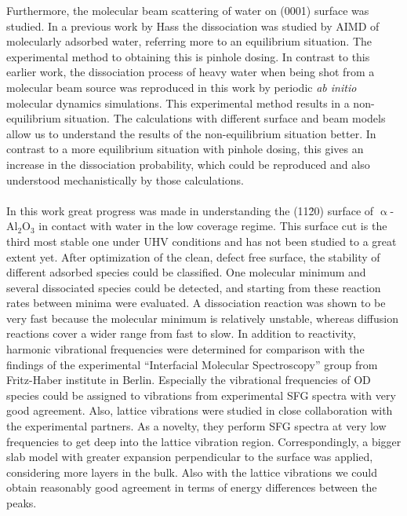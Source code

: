 \documentclass[11pt,DIV=13,BCOR=5mm,a4paper,headinclude]{scrbook}
\begin{document}
Furthermore, the molecular beam scattering of water on (0001) surface was studied.
In a previous work by Hass the dissociation was studied by AIMD of molecularly adsorbed water, referring more to an equilibrium situation.
The experimental method to obtaining this is pinhole dosing.
In contrast to this earlier work, the dissociation process of heavy water when being shot from a molecular beam source was reproduced in this work by periodic \textit{ab initio} molecular dynamics simulations.
This experimental method results in a non-equilibrium situation.
The calculations with different surface and beam models allow us to understand the results of the non-equilibrium situation better.
In contrast to a more equilibrium situation with pinhole dosing, this gives an increase in the dissociation probability, which could be reproduced and also understood mechanistically by those calculations.
\\\\
In this work great progress was made in understanding the (11\=20) surface of $\upalpha$-Al$_2$O$_3$ in contact with water in the low coverage regime.
This surface cut is the third most stable one under UHV conditions and has not been studied to a great extent yet.
After optimization of the clean, defect free surface, the stability of different adsorbed species could be classified.
One molecular minimum and several dissociated species could be detected, and starting from these reaction rates between minima were evaluated.
A dissociation reaction was shown to be very fast because the molecular minimum is relatively unstable, whereas diffusion reactions cover a wider range from fast to slow.
In addition to reactivity, harmonic vibrational frequencies were determined for comparison with the findings of the experimental ``Interfacial Molecular Spectroscopy'' group  from Fritz-Haber institute in Berlin.
Especially the vibrational frequencies of OD species could be assigned to vibrations from experimental SFG spectra with very good agreement.
Also, lattice vibrations were studied in close collaboration with the experimental partners.
As a novelty, they perform SFG spectra at very low frequencies to get deep into the lattice vibration region.
Correspondingly, a bigger slab model with greater expansion perpendicular to the surface was applied, considering more layers in the bulk.
Also with the lattice vibrations we could obtain reasonably good agreement in terms of energy differences between the peaks.
\end{document}
